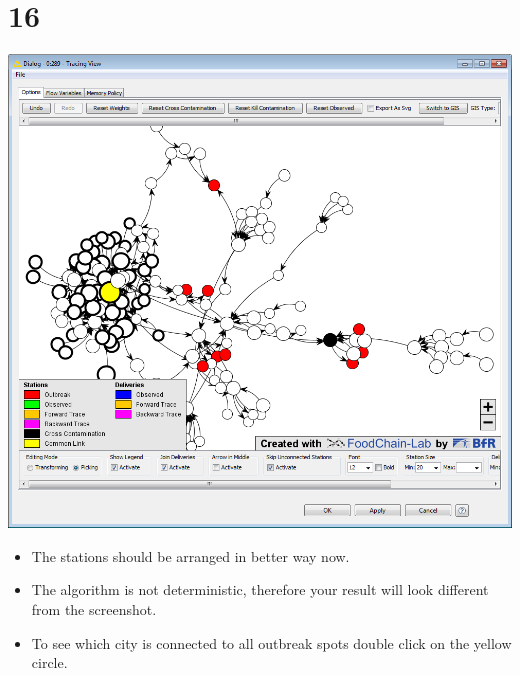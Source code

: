 \documentclass{beamer}
\begin{document}
\section{16}
\begin{frame}
	\begin{center}
  		\includegraphics[height=0.6\textheight]{16.png}
	\end{center}
	\begin{itemize}
		\item The stations should be arranged in better way now.
		\item The algorithm is not deterministic, therefore your result will look different from the screenshot.
		\item To see which city is connected to all outbreak spots double click on the yellow circle.		
	\end{itemize}
\end{frame}
\end{document}
